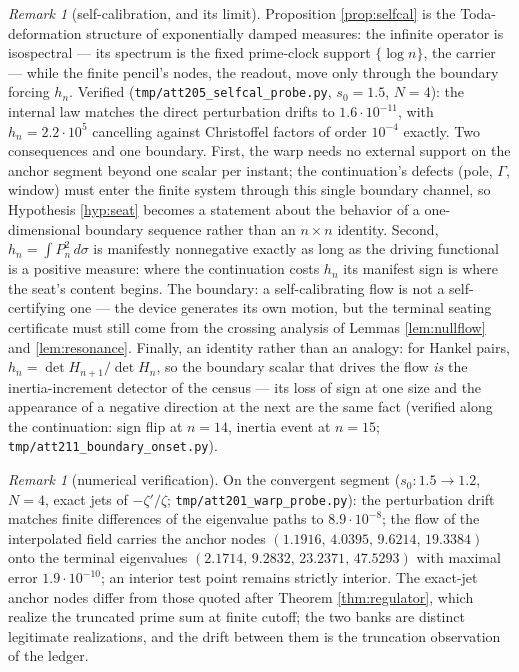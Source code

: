 \documentclass[11pt]{article}
\theoremstyle{plain}
\theoremstyle{definition}
\theoremstyle{remark}
\newtheorem{remark}[theorem]{Remark}
\begin{document}
\begin{remark}[self-calibration, and its limit]\label{rem:selfcal}
Proposition \ref{prop:selfcal} is the Toda-deformation structure of exponentially
damped measures: the infinite operator is isospectral --- its spectrum is the fixed
prime-clock support $\{\log n\}$, the carrier --- while the finite pencil's nodes, the
readout, move only through the boundary forcing $h_n$. Verified
(\texttt{tmp/att205\_selfcal\_probe.py}, $s_0=1.5$, $N=4$): the internal law matches
the direct perturbation drifts to $1.6\cdot10^{-11}$, with $h_n=2.2\cdot10^{5}$
cancelling against Christoffel factors of order $10^{-4}$ exactly. Two consequences
and one boundary. First, the warp needs no external support on the anchor segment
beyond one scalar per instant; the continuation's defects (pole, $\Gamma$, window)
must enter the finite system through this single boundary channel, so Hypothesis
\ref{hyp:seat} becomes a statement about the behavior of a one-dimensional boundary
sequence rather than an $n\times n$ identity. Second, $h_n=\int P_n^2\,d\sigma$ is
manifestly nonnegative exactly as long as the driving functional is a positive
measure: where the continuation costs $h_n$ its manifest sign is where the seat's
content begins. The boundary: a self-calibrating flow is not a self-certifying one
--- the device generates its own motion, but the terminal seating certificate must
still come from the crossing analysis of Lemmas \ref{lem:nullflow} and
\ref{lem:resonance}. Finally, an identity rather than an analogy: for Hankel pairs,
$h_n=\det H_{n+1}/\det H_n$, so the boundary scalar that drives the flow \emph{is}
the inertia-increment detector of the census --- its loss of sign at one size and
the appearance of a negative direction at the next are the same fact (verified along
the continuation: sign flip at $n=14$, inertia event at $n=15$;
\texttt{tmp/att211\_boundary\_onset.py}).
\end{remark}

\begin{remark}[numerical verification]
On the convergent segment ($s_0\colon1.5\to1.2$, $N=4$, exact jets of $-\zeta'/\zeta$;
\texttt{tmp/att201\_warp\_probe.py}): the perturbation drift matches finite differences
of the eigenvalue paths to $8.9\cdot10^{-8}$; the flow of the interpolated field carries
the anchor nodes $(1.1916,\,4.0395,\,9.6214,\,19.3384)$ onto the terminal eigenvalues
$(2.1714,\,9.2832,\,23.2371,\,47.5293)$ with maximal error $1.9\cdot10^{-10}$; an
interior test point remains strictly interior. The exact-jet anchor nodes differ from
those quoted after Theorem \ref{thm:regulator}, which realize the truncated prime sum at
finite cutoff; the two banks are distinct legitimate realizations, and the drift between
them is the truncation observation of the ledger.
\end{remark}
\end{document}
